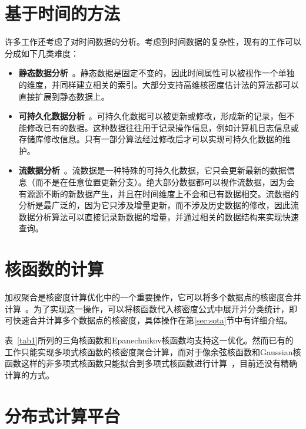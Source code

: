 \section{基于时间的方法}
\label{sec:2.2}

许多工作还考虑了对时间数据的分析。考虑到时间数据的复杂性，现有的工作可以分成如下几类难度：

\begin{itemize}[leftmargin=*]
	\item \textbf{静态数据分析}~\cite{patuelli2007network, mouratidis2006continuous}。静态数据是固定不变的，因此时间属性可以被视作一个单独的维度，并同样建立相关的索引。大部分支持高维核密度估计法的算法都可以直接扩展到静态数据上。
	
	\item \textbf{可持久化数据分析}~\cite{sasikala2014uncertain, cheng2012spatio}。可持久化数据可以被更新或修改，形成新的记录，但不能修改已有的数据。这种数据往往用于记录操作信息，例如计算机日志信息或存储库修改信息。只有一部分算法经过修改后才可以实现可持久化数据的维护。
	
	\item \textbf{流数据分析}~\cite{koudas2004approximate, figueiras2018real, li2021trace}。流数据是一种特殊的可持久化数据，它只会更新最新的数据信息（而不是在任意位置更新分支）。绝大部分数据都可以视作流数据，因为会有源源不断的新数据产生，并且在时间维度上不会和已有数据相交。流数据的分析是最广泛的，因为它只涉及增量更新，而不涉及历史数据的修改，因此流数据分析算法可以直接记录新数据的增量，并通过相关的数据结构来实现快速查询。
\end{itemize}

\section{核函数的计算}

	加权聚合是核密度计算优化中的一个重要操作，它可以将多个数据点的核密度合并计算~\cite{chan_fast_2021}。为了实现这一操作，可以将核函数代入核密度公式中展开并分类统计，即可快速合并计算多个数据点的核密度，具体操作在第\ref{sec:sota}节中有详细介绍。

	表~\ref{tab1}所列的三角核函数和Epanechnikov核函数均支持这一优化。然而已有的工作只能实现多项式核函数的核密度聚合计算，而对于像余弦核函数和Gaussian核函数这样的非多项式核函数只能拟合到多项式核函数进行计算~\cite{chan_karl_2019, chan_quad_2020}，目前还没有精确计算的方式。
	
	
\section{分布式计算平台}

